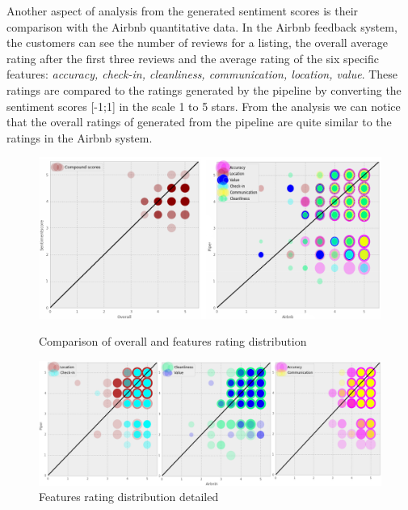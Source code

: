 Another aspect of analysis from the generated sentiment scores is their comparison with the Airbnb quantitative data. In the Airbnb feedback system, the customers can see the number of reviews for a listing, the overall average rating after the first three reviews and the average rating of the six specific features: \textit{accuracy, check-in, cleanliness, communication, location, value}. These ratings are compared to the ratings generated by the pipeline by converting the sentiment scores [-1;1] in the scale 1 to 5 stars. From the analysis we can notice that the overall ratings of generated from the pipeline are quite similar to the ratings in the Airbnb system. 
\begin{figure}[h!]
\centering
	\includegraphics[height=0.33\textheight]{overall_features}
	\caption{Comparison of overall and features rating distribution}
	\label{fig:ovfea}
    	\includegraphics[height=0.25\textheight]{features_distribution}
	\caption{Features rating distribution detailed}
	\label{fig:fea}
\end{figure}

